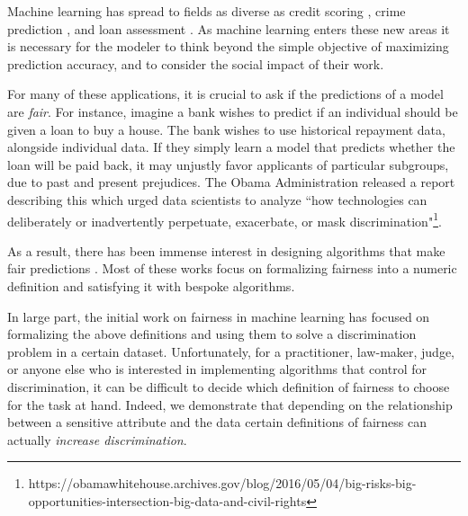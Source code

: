 Machine learning has spread to fields as diverse as credit scoring \cite{khandani2010consumer}, crime prediction \cite{brennan2009evaluating}, and loan assessment \cite{mahoney2007method}. As
machine learning enters these new areas it is necessary for the
modeler to think beyond the simple objective of maximizing prediction
accuracy, and to consider the social impact of their work.

For many of these applications, it is crucial to
ask if the predictions of a model are
\emph{fair}. For instance, imagine a bank wishes to predict if an individual should be given
a loan to buy a house. The bank wishes to use historical repayment data, alongside  individual data. If they simply learn a model
that  predicts whether the
loan will be paid back, it may unjustly favor
applicants of particular subgroups, due to past and
present prejudices. The Obama Administration released a report
describing this which urged data scientists to
analyze ``how technologies can deliberately or inadvertently
perpetuate, exacerbate, or mask
discrimination"\footnote{https://obamawhitehouse.archives.gov/blog/2016/05/04/big-risks-big-opportunities-intersection-big-data-and-civil-rights}.

As a result, there has been immense interest in designing
algorithms that make fair predictions
\cite{hardt2016equality,dwork2012fairness,joseph2016rawlsian,kamishima2011fairness,zliobaite2015survey,zafar2016fairness,zafar2015learning,grgiccase,kleinberg2016inherent,calders2010three,kamiran2012data,bolukbasi2016man,kamiran2009classifying,zemel2013learning,louizos2015variational}. Most
of these works focus on formalizing fairness into a numeric
definition and satisfying it with bespoke algorithms.

In large part, the initial work on fairness in machine learning has
focused on formalizing the above definitions and using them to solve a
discrimination problem in a certain dataset. Unfortunately, for a
practitioner, law-maker, judge, or anyone else who is interested in
implementing algorithms that control for discrimination, it can be
difficult to decide which definition of fairness to choose for the
task at hand. Indeed, we demonstrate that depending on the
relationship between a sensitive attribute and the data certain
definitions of fairness can actually \emph{increase discrimination}.

